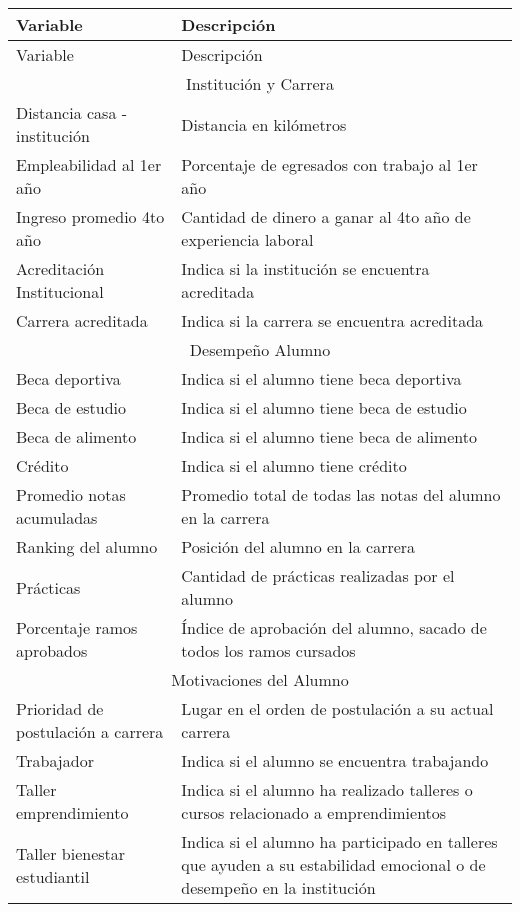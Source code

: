 \begin{longtable}{| p{4cm}| p{8cm} |}
	\hline
	Variable & Descripción \\
	\hline \hline
	\endfirsthead	
	\hline
	Variable & Descripción \\
	\hline \hline
	\endhead
		
	\multicolumn{2}{|c|}{Institución y Carrera} \\ \hline
	\hline
	Distancia casa - institución & Distancia en kilómetros \\ \hline
Empleabilidad al 1er año  & Porcentaje de egresados con trabajo al 1er año \\ \hline
Ingreso promedio 4to año & Cantidad de dinero a ganar al 4to año de experiencia laboral  \\ \hline
Acreditación Institucional & Indica si la institución se encuentra acreditada\\ \hline
Carrera acreditada & Indica si la carrera se encuentra acreditada \\ \hline 
\hline
\multicolumn{2}{|c|}{Desempeño Alumno} \\ \hline
\hline	
Beca deportiva & Indica si el alumno tiene beca deportiva\\ \hline
Beca de estudio  & Indica si el alumno tiene beca de estudio\\ \hline
Beca de alimento & Indica si el alumno tiene beca de alimento\\ \hline
Crédito  & Indica si el alumno tiene crédito\\ \hline
Promedio notas acumuladas & Promedio total de todas las notas del alumno en la carrera\\ \hline    
Ranking del alumno & Posición del alumno en la carrera\\ \hline
Prácticas & Cantidad de prácticas realizadas por el alumno\\ \hline 
Porcentaje ramos aprobados & Índice de aprobación del alumno, sacado de todos los ramos cursados\\ \hline
\hline
\multicolumn{2}{|c|}{Motivaciones del Alumno} \\ \hline
\hline	   
Prioridad de postulación a carrera  & Lugar en el orden de postulación a su actual carrera\\ \hline
Trabajador &  Indica si el alumno se encuentra trabajando\\ \hline 
Taller emprendimiento  & Indica si el alumno ha realizado talleres o cursos relacionado a emprendimientos\\ \hline
Taller bienestar estudiantil & Indica si el alumno ha participado en talleres que ayuden a su estabilidad emocional o de desempeño en la institución\\ \hline		

\end{longtable}
